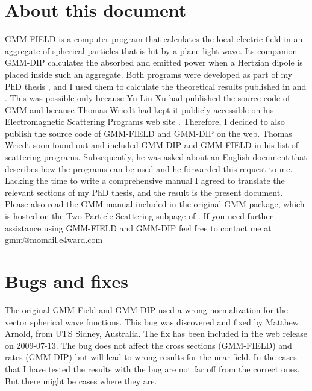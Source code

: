 %
\maketitle

\section{About this document}
GMM-FIELD is a computer program that calculates the local electric field in an
aggregate of spherical particles that is hit by a plane light wave. Its companion
GMM-DIP calculates the absorbed and emitted power when a Hertzian dipole is placed
inside such an aggregate. Both programs were developed as part of my PhD thesis
\cite{phdrin08}, and I used them to calculate the theoretical results published in
\cite{bek07} and \cite{rin08}. This was possible only because Yu-Lin Xu
had published the source code of GMM and because Thomas Wriedt had kept it publicly
accessible on his Electromagnetic Scattering Programs web site \cite{wwwwriedt}.
Therefore, I decided to also publish the source code of GMM-FIELD and GMM-DIP
on the web.
Thomas Wriedt soon found out and included GMM-DIP and GMM-FIELD in his list of
scattering programs. Subsequently, he was asked about an English document that
describes how the programs can be used and he forwarded this
request to me. Lacking the time to write a comprehensive manual I agreed to
translate the relevant sections of my PhD thesis, and the result is the present
document. Please also read the GMM manual included in the original GMM package,
which is hosted on the Two Particle Scattering subpage of \cite{wwwwriedt}.
If you need further assistance using GMM-FIELD and GMM-DIP feel free to contact
me at gmm@momail.e4ward.com

\section{Bugs and fixes}
The original GMM-Field and GMM-DIP used a wrong normalization for the vector
spherical wave functions. This bug was discovered and fixed by Matthew Arnold, from UTS
Sidney, Australia. The fix has been included in the web release on 2009-07-13.
The bug does not affect the cross sections (GMM-FIELD) and rates (GMM-DIP) but will lead
to wrong results for the near field. In the cases that I have tested the
results with the bug are not far off from the correct ones. But there might be
cases where they are.

